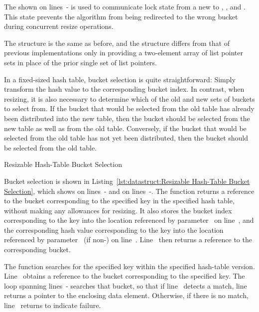 \begin{lineref}
The  shown on lines~-
is used to communicate lock state from a new 
to , , and .
This state prevents the algorithm from being redirected to the wrong
bucket during concurrent resize operations.

The  structure is the same as before, and the
 structure differs from that of previous implementations
only in providing a two-element array of list pointer sets in place of
the prior single set of list pointers.

In a fixed-sized hash table, bucket selection is quite straightforward:
Simply transform the hash value to the corresponding bucket index.
In contrast, when resizing, it is also necessary to determine which
of the old and new sets of buckets to select from.
If the bucket that would be selected from the old table has already
been distributed into the new table, then the bucket should be selected
from the new table as well as from the old table.
Conversely, if the bucket that would be selected from the old table
has not yet been distributed, then the bucket should be selected from
the old table.
\end{lineref}

\begin{listing}[tb]

\caption{Resizable Hash-Table Bucket Selection}
\label{lst:datastruct:Resizable Hash-Table Bucket Selection}
\end{listing}

\begin{lineref}
Bucket selection is shown in
Listing~\ref{lst:datastruct:Resizable Hash-Table Bucket Selection},
which shows  on
lines~- and  on
lines~-.
The  function returns a reference to the bucket
corresponding to the specified key in the specified hash table, without
making any allowances for resizing.
It also stores the bucket index corresponding to the key into the location
referenced by parameter~ on
line~, and the corresponding
hash value corresponding to the key into the location
referenced by parameter~ (if non-) on line~.
Line~ then returns a reference to the corresponding bucket.

The  function searches for the specified key
within the specified hash-table version.
Line~ obtains a reference to the bucket corresponding
to the specified key.
The loop spanning lines~- searches
that bucket, so that if line~ detects a match,
line~ returns a pointer to the enclosing data element.
Otherwise, if there is no match,
line~ returns  to indicate
failure.
\end{lineref}

